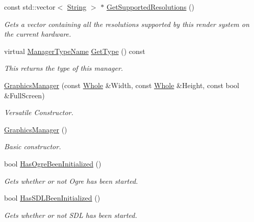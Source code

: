 \begin{DoxyCompactItemize}
const std::vector$<$ \hyperlink{namespacephys_aa03900411993de7fbfec4789bc1d392e}{String} $>$ $\ast$ \hyperlink{classphys_1_1GraphicsManager_a4bfa1c07f2c2305ec892e603a71c6341}{GetSupportedResolutions} ()
\begin{DoxyCompactList}\small\item\em Gets a vector containing all the resolutions supported by this render system on the current hardware. \item\end{DoxyCompactList}\item 
virtual \hyperlink{classphys_1_1ManagerBase_aaa6ccddf23892eaccb898529414f80a5}{ManagerTypeName} \hyperlink{classphys_1_1GraphicsManager_abf48faad2e09cd564442e66bc0473e58}{GetType} () const 
\begin{DoxyCompactList}\small\item\em This returns the type of this manager. \item\end{DoxyCompactList}\item 
\hyperlink{classphys_1_1GraphicsManager_a886beb1a86c4d25fde0a2965e464be62}{GraphicsManager} (const \hyperlink{namespacephys_a460f6bc24c8dd347b05e0366ae34f34a}{Whole} \&Width, const \hyperlink{namespacephys_a460f6bc24c8dd347b05e0366ae34f34a}{Whole} \&Height, const bool \&FullScreen)
\begin{DoxyCompactList}\small\item\em Versatile Constructor. \item\end{DoxyCompactList}\item 
\hyperlink{classphys_1_1GraphicsManager_a8ad84818a761900ef4d03575d7543fa1}{GraphicsManager} ()
\begin{DoxyCompactList}\small\item\em Basic constructor. \item\end{DoxyCompactList}\item 
bool \hyperlink{classphys_1_1GraphicsManager_ab7ab98ff594726f8cc6d3ca0fac0ecdf}{HasOgreBeenInitialized} ()
\begin{DoxyCompactList}\small\item\em Gets whether or not Ogre has been started. \item\end{DoxyCompactList}\item 
bool \hyperlink{classphys_1_1GraphicsManager_ad07600281c765e22bc413a1a9df1a22c}{HasSDLBeenInitialized} ()
\begin{DoxyCompactList}\small\item\em Gets whether or not SDL has been started. \item\end{DoxyCompactList}\item 

\end{DoxyCompactItemize}
